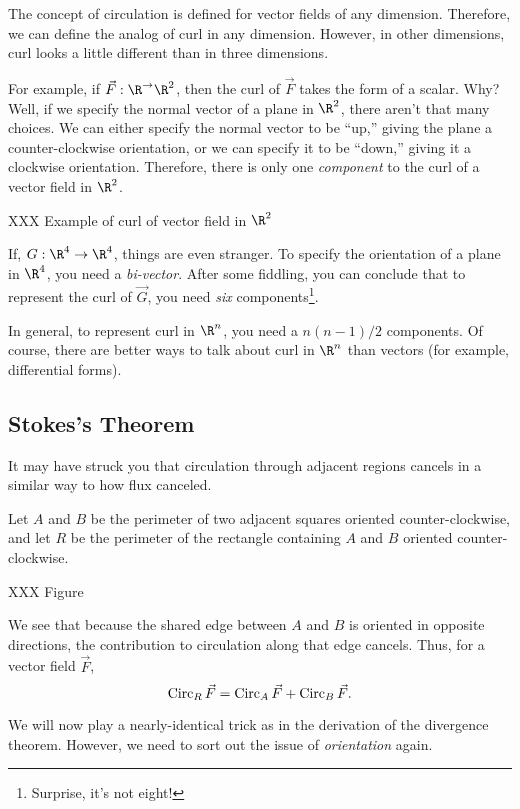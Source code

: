 The concept of circulation is defined for vector fields of any dimension.
Therefore, we can define the analog of curl in any dimension.  However,
in other dimensions, curl looks a little different than in three dimensions.

For example, if $\vec F:\R^\to\R^2$, then the curl of $\vec F$ takes the form
of a scalar.  Why?  Well, if we specify the normal vector of a plane in
$\R^2$, there aren't that many choices.  We can either specify the normal 
vector to be ``up,'' giving the plane a counter-clockwise orientation, or
we can specify it to be ``down,'' giving it a clockwise orientation.  Therefore,
there is only one \emph{component} to the curl of a vector field in $\R^2$.

\begin{example}
	XXX Example of curl of vector field in $\R^2$
\end{example}

If, $G:\R^4\to\R^4$, things are even stranger.  To specify the orientation
of a plane in $\R^4$, you need a \emph{bi-vector}.  After 
some fiddling, you can conclude that to represent the curl of $\vec G$, you
need \emph{six} components\footnote{ Surprise, it's not eight!}.

In general, to represent curl in $\R^n$, you need a $n(n-1)/2$ components.
Of course, there are better ways to talk about curl in $\R^n$ than vectors
(for example, differential forms).

\subsection{Stokes's Theorem}

It may have struck you that circulation through adjacent regions cancels
in a similar way to how flux canceled.

Let $A$ and $B$ be the perimeter of two adjacent squares oriented counter-clockwise,
and let $R$ be the perimeter of the rectangle containing $A$ and $B$ oriented 
counter-clockwise.

XXX Figure

We see that because the shared edge between $A$ and $B$ is oriented in opposite
directions, the contribution to circulation along that edge cancels.  Thus, for a vector
field $\vec F$,
\[
	\operatorname{Circ}_R\vec F = \operatorname{Circ}_A\vec F+\operatorname{Circ}_B \vec F. 
\]

We will 
now play a nearly-identical trick as in the derivation of the divergence theorem.  However,
we need to sort out the issue of \emph{orientation} again.


